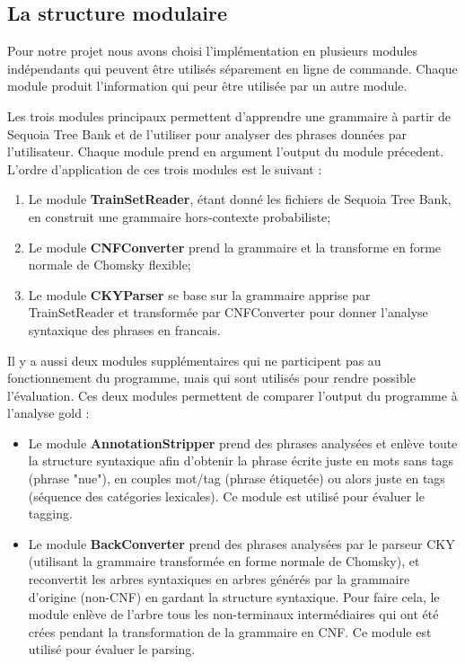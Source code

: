 \documentclass[12pt]{article}
\begin{document}
\subsection{La structure modulaire}
Pour notre projet nous avons choisi l'impl\'ementation en plusieurs modules
indépendants qui peuvent être utilisés séparement en ligne de commande. Chaque
module produit l'information qui peur \^etre utilis\'ee par un autre module.
\par
Les trois modules principaux permettent d'apprendre une grammaire \`a
partir de Sequoia Tree Bank \cite{Sequoia} et de l'utiliser pour analyser des phrases donn\'ees par l'utilisateur. Chaque module prend en argument l'output du module pr\'ecedent. L'ordre d'application de ces trois modules est le suivant :
\begin{enumerate}
  \item Le module \textbf{TrainSetReader}, \'etant donn\'e les fichiers de
  Sequoia Tree Bank, en construit une grammaire hors-contexte probabiliste;
  \item Le module \textbf{CNFConverter} prend la grammaire et la transforme en
  forme normale de Chomsky flexible;
  \item Le module \textbf{CKYParser} se base sur la grammaire apprise par
  TrainSetReader et transform\'ee par CNFConverter pour donner l'analyse syntaxique des phrases
  en francais.
\end{enumerate}

Il y a aussi deux modules suppl\'ementaires qui ne participent pas au
fonctionnement du programme, mais qui sont utilis\'es pour rendre possible
l'\'evaluation. Ces deux modules permettent de comparer l'output du programme
\`a l'analyse gold :
\begin{itemize}
  \item Le module \textbf{AnnotationStripper} prend des phrases analys\'ees et
  enl\`eve toute la structure syntaxique afin d'obtenir la phrase \'ecrite juste
  en mots sans tags (phrase "nue"), en couples mot/tag (phrase \'etiquet\'ee) ou
  alors juste en tags (s\'equence des cat\'egories lexicales). Ce module est
  utilis\'e pour \'evaluer le tagging.
  \item Le module \textbf{BackConverter} prend des phrases analys\'ees par le
  parseur CKY (utilisant la grammaire transform\'ee en forme normale de Chomsky), et
  reconvertit les arbres syntaxiques en arbres g\'en\'er\'es par la grammaire
  d'origine (non-CNF) en gardant la structure syntaxique. Pour faire cela, le
  module enl\`eve de l'arbre tous les non-terminaux interm\'ediaires qui ont
  \'et\'e cr\'ees pendant la transformation de la grammaire en CNF. Ce module
  est utilis\'e pour \'evaluer le parsing.
\end{itemize}
\end{document}
